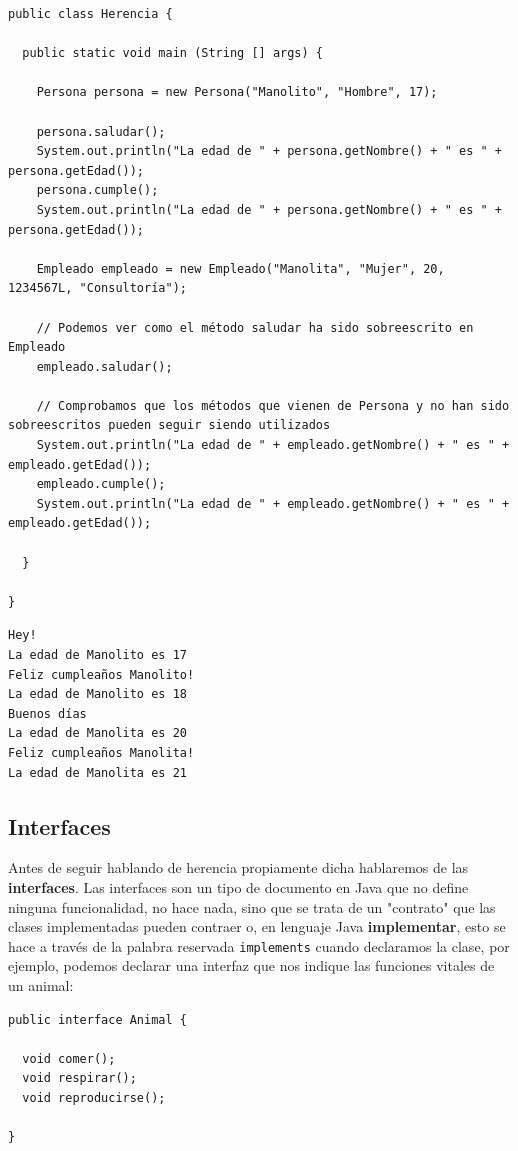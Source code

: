 \documentclass[11pt]{article}
\begin{document}
\begin{verbatim}
public class Herencia {

  public static void main (String [] args) {

    Persona persona = new Persona("Manolito", "Hombre", 17);

    persona.saludar();
    System.out.println("La edad de " + persona.getNombre() + " es " + persona.getEdad());
    persona.cumple();
    System.out.println("La edad de " + persona.getNombre() + " es " + persona.getEdad());

    Empleado empleado = new Empleado("Manolita", "Mujer", 20, 1234567L, "Consultoría");

    // Podemos ver como el método saludar ha sido sobreescrito en Empleado
    empleado.saludar();

    // Comprobamos que los métodos que vienen de Persona y no han sido sobreescritos pueden seguir siendo utilizados
    System.out.println("La edad de " + empleado.getNombre() + " es " + empleado.getEdad());
    empleado.cumple();
    System.out.println("La edad de " + empleado.getNombre() + " es " + empleado.getEdad());

  }

}
\end{verbatim}

\begin{verbatim}
Hey!
La edad de Manolito es 17
Feliz cumpleaños Manolito!
La edad de Manolito es 18
Buenos días
La edad de Manolita es 20
Feliz cumpleaños Manolita!
La edad de Manolita es 21
\end{verbatim}

\subsection{Interfaces}
\label{sec:org458d96d}
Antes de seguir hablando de herencia propiamente dicha hablaremos de las \textbf{interfaces}. Las interfaces son un tipo de documento en Java que no define ninguna funcionalidad, no hace nada, sino que se trata de un "contrato" que las clases implementadas pueden contraer o, en lenguaje Java \textbf{implementar}, esto se hace a través de la palabra reservada \texttt{implements} cuando declaramos la clase, por ejemplo, podemos declarar una interfaz que nos indique las funciones vitales de un animal:

\begin{verbatim}
public interface Animal {

  void comer();
  void respirar();
  void reproducirse();

}
\end{verbatim}
\end{document}
